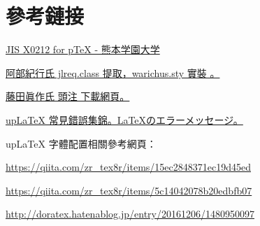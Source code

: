 
\section{參考鏈接}

\par\href{http://www2.kumagaku.ac.jp/teacher/herogw/}{JIS X0212 for pTeX - 熊本学園大学}
\par \href{http://abenori.blogspot.com/2016/07/warichu-eplatex.html}{阿部紀行氏 jlreq.class 提取，warichus.sty 實裝 。}

\par\href{http://xymtex.com/fujitas2/texlatex/index.html}{藤田眞作氏 頭注 下載網頁。}


\par 
\href{https://texwiki.texjp.org/?LaTeX%20%E3%81%AE%E3%82%A8%E3%83%A9%E3%83%BC%E3%83%A1%E3%83%83%E3%82%BB%E3%83%BC%E3%82%B8}{{up\LaTeX} 常見錯誤集錦。\LaTeX のエラーメッセージ。}


\par {up\LaTeX} 字體配置相關參考網頁：
\par\url{https://qiita.com/zr_tex8r/items/15ec2848371ec19d45ed}
\par\url{https://qiita.com/zr_tex8r/items/5c14042078b20edbfb07}
\par\url{http://doratex.hatenablog.jp/entry/20161206/1480950097}

\endinput